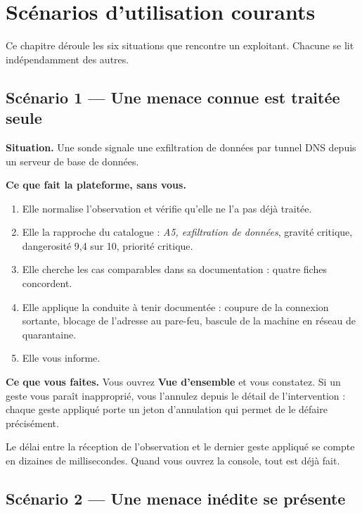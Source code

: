 \chapter{Scénarios d'utilisation courants}
\minitoc

Ce chapitre déroule les six situations que rencontre un exploitant. Chacune se
lit indépendamment des autres.

\section{Scénario 1 --- Une menace connue est traitée seule}

\textbf{Situation.} Une sonde signale une exfiltration de données par tunnel
DNS depuis un serveur de base de données.

\textbf{Ce que fait la plateforme, sans vous.}

\begin{enumerate}[leftmargin=*]
  \item Elle normalise l'observation et vérifie qu'elle ne l'a pas déjà traitée.
  \item Elle la rapproche du catalogue : \emph{A5, exfiltration de données},
        gravité critique, dangerosité 9,4 sur 10, priorité critique.
  \item Elle cherche les cas comparables dans sa documentation : quatre fiches
        concordent.
  \item Elle applique la conduite à tenir documentée : coupure de la connexion
        sortante, blocage de l'adresse au pare-feu, bascule de la machine en
        réseau de quarantaine.
  \item Elle vous informe.
\end{enumerate}

\textbf{Ce que vous faites.} Vous ouvrez \textbf{Vue d'ensemble} et vous
constatez. Si un geste vous paraît inapproprié, vous l'annulez depuis le détail
de l'intervention : chaque geste appliqué porte un jeton d'annulation qui
permet de le défaire précisément.

\begin{tcolorbox}[colback=green!4!white, colframe=darkgreen,
  title=\textbf{Bon à savoir}, fonttitle=\bfseries, boxrule=0.6pt]
Le délai entre la réception de l'observation et le dernier geste appliqué se
compte en dizaines de millisecondes. Quand vous ouvrez la console, tout est
déjà fait.
\end{tcolorbox}

\section{Scénario 2 --- Une menace inédite se présente}

